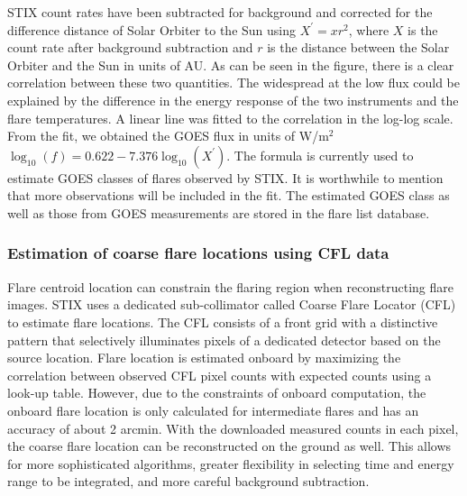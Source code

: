 \documentclass[referee]{aa} %
\begin{document}
STIX count rates  have been subtracted for background and corrected for 
the difference distance of Solar Orbiter to the Sun using $X^{'}=x r^2$, where $X$ is the count rate after background subtraction
 and $r$ is the distance between the Solar Orbiter and the Sun in units of AU. 
As can be seen in the figure, there is a clear correlation between
these two quantities.  The widespread at the low flux could be explained by the difference in 
the energy response of the two instruments and the flare temperatures. 
A linear line was fitted to the correlation in the log-log scale. 
From the fit, we obtained 
the GOES flux in units of W/m$^2$ $\log_{10}(f) = 0.622 -7.376 \log_{10} (X^{'})$.
The formula is currently used to estimate GOES classes of flares observed by STIX. 
It is worthwhile to mention that more observations will be included in the fit.
The estimated GOES class as well as those from GOES measurements 
are stored in the flare list database. 

\subsubsection{Estimation of coarse flare locations using CFL data}
Flare centroid location can constrain the flaring region when reconstructing flare images.
STIX uses a dedicated sub-collimator called Coarse Flare Locator (CFL) to estimate flare locations.
The CFL consists of a front grid with
a distinctive pattern that selectively illuminates pixels of a 
dedicated detector based on the source location.
Flare location is estimated onboard by maximizing the correlation between observed CFL pixel counts 
with expected counts using a look-up table. 
However, due to the constraints of onboard computation, the onboard flare location is  only calculated for intermediate flares 
and has an accuracy of about 2 arcmin. 
With the downloaded measured counts in each pixel,
the coarse flare location can be reconstructed on the ground as well. 
This allows for more sophisticated algorithms, greater flexibility in selecting time and energy 
range to be integrated, and more careful background subtraction.
\end{document}
